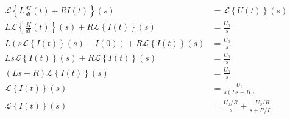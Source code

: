 \documentclass{article}
\newcommand{\Laplace}[1]{\mathcal{L}\left\{#1\right\}(s)}
\begin{document}
\begin{align*}
    \Laplace{L \frac{dI}{dt}(t) + RI(t)} & = \Laplace{U(t)} \\
    L\Laplace{\frac{dI}{dt}(t)} + R\Laplace{I(t)} & = \frac{U_0}{s} \\
    L(s\Laplace{I(t)} - I(0)) + R\Laplace{I(t)} & = \frac{U_0}{s} \\
    Ls\Laplace{I(t)} + R\Laplace{I(t)} & = \frac{U_0}{s} \\
    (Ls+R)\Laplace{I(t)}  & = \frac{U_0}{s} \\
    \Laplace{I(t)}  & = \frac{U_0}{s(Ls+R)} \\
    \Laplace{I(t)}  & = \frac{U_0/R}{s} + \frac{-U_0/R}{s+R/L}
\end{align*}
\end{document}
